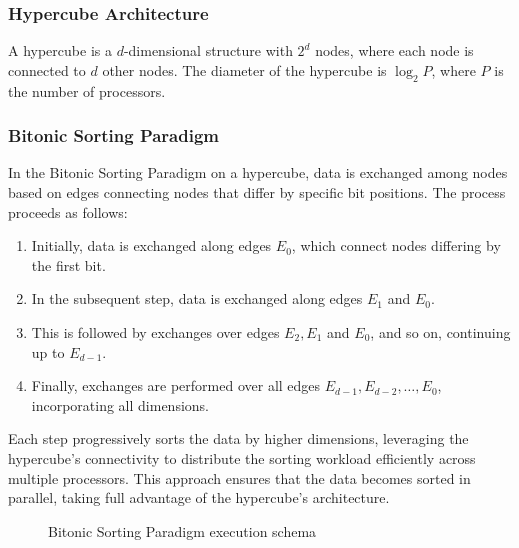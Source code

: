 \documentclass[12pt,conference]{ieeeconf} %
\begin{document}
\subsubsection{Hypercube Architecture}
A hypercube\cite{boman1990hypercube} is a $d$-dimensional structure with $2^d$ nodes, where each node is connected to $d$ other nodes. The diameter of the hypercube is $\log_2{P}$, where $P$ is the number of processors.\par

\subsubsection{Bitonic Sorting Paradigm}
In the Bitonic Sorting Paradigm\cite{batcher1968sorting} on a hypercube, data is exchanged among nodes based on edges connecting nodes that differ by specific bit positions. The process proceeds as follows:
\begin{enumerate}
    \item Initially, data is exchanged along edges $E_0$, which connect nodes differing by the first bit.
    \item In the subsequent step, data is exchanged along edges $E_1$ and $E_0$.
    \item This is followed by exchanges over edges $E_2, E_1$ and $E_0$, and so on, continuing up to $E_{d-1}$.
    \item Finally, exchanges are performed over all edges $E_{d-1}, E_{d-2}, \ldots, E_0$, incorporating all dimensions.
\end{enumerate}

Each step progressively sorts the data by higher dimensions, leveraging the hypercube's connectivity to distribute the sorting workload efficiently across multiple processors. This approach ensures that the data becomes sorted in parallel, taking full advantage of the hypercube's architecture.\par

\begin{figure}[thpb]
\centering
{}
\caption{Bitonic Sorting Paradigm execution schema}
\end{figure}
\end{document}
